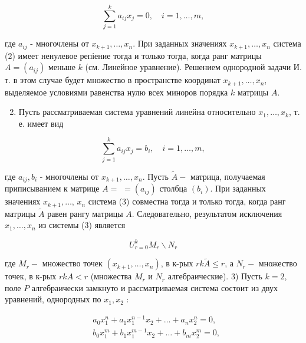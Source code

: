\documentclass[10pt]{article}
\begin{document}
\[

\sum_{j=1}^{k} a_{i j} x_{j}=0, \quad i=1, \ldots, m,

\]



где $a_{i j}$ - многочлены от $x_{k+1}, \ldots, x_{n}$. При заданных значениях $x_{k+1}, \ldots, x_{n}$ система (2) имеет ненулевое репіение тогда и только тогда, когда ранг матрицы $A=\left(a_{i j}\right)$ меньше $k$ (см. Линейное уравнение). Решением однородной задачи И. т. в этом случае будет множество в пространстве координат $x_{k+1}, \ldots, x_{n}$, выделяемое условиями равенства нулю всех миноров порядка $k$ матрицы $A$.



\begin{enumerate}

  \setcounter{enumi}{1}

  \item Пусть рассматриваемая система уравнений линейна относительно $x_{1}, \ldots, x_{k}$, т. е. имеет вид

\end{enumerate}



\[

\sum_{j=1}^{k} a_{i j} x_{j}=b_{i}, \quad i=1, \ldots, m,

\]



где $a_{i j}, b_{i}$ - многочлены от $x_{k+1}, \ldots, x_{n}$. Пусть $\tilde{A}-$ матрица, получаемая приписыванием к матрице $A=$ $=\left(a_{i j}\right)$ столбца $\left(b_{i}\right)$. При заданных значениях $x_{k+1}, \ldots$, $x_{n}$ система (3) совместна тогда и только тогда, когда ранг матрицы $\tilde{A}$ равен рангу матрицы $A$. Следовательно, результатом исключения $x_{1}, \ldots, x_{n}$ из системы (3) является



\[

U_{r=0}^{k} M_{r} \backslash N_{r}

\]



где $M_{r}-$ множество точек $\left(x_{k+1}, \ldots, x_{n}\right)$, в к-рых $r k \tilde{A} \leqslant r$, а $N_{r}-$ множество точек, в к-рых $r k A<r$ (множества $M_{r}$ и $N_{r}$ алгебраические). 3) Пусть $k=2$, поле $P$ алгебраически замкнуто и рассматриваемая система состоит из двух уравнений, однородных по $x_{1}, x_{2}$ :



\[

\begin{aligned}

& a_{0} x_{1}^{n}+a_{1} x_{1}^{n-1} x_{2}+\ldots+a_{n} x_{2}^{n}=0, \\

& b_{0} x_{1}^{m}+b_{1} x_{1}^{m-1} x_{2}+\ldots+b_{m} x_{2}^{m}=0,

\end{aligned}

\]
\end{document}
